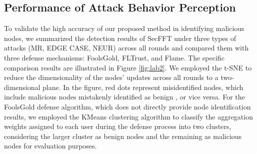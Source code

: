 \documentclass[lettersize,journal]{IEEEtran}
\begin{document}
\subsection{Performance of Attack Behavior Perception}
To validate the high accuracy of our proposed method in identifying malicious nodes, we summarized the detection results of SecFFT under three types of attacks (MR, EDGE CASE, NEUR) across all rounds and compared them with three defense mechanisms: FoolsGold, FLTrust, and Flame. The specific comparison results are illustrated in Figure \ref{fig:lab2}. We employed the t-SNE to reduce the dimensionality of the nodes' updates across all rounds to a two-dimensional plane. In the figure, red dots represent misidentified nodes, which include malicious nodes mistakenly identified as benign , or vice versa. For the FoolsGold defense algorithm, which does not directly provide node identification results, we employed the KMeans clustering algorithm to classify the aggregation weights assigned to each user during the defense process into two clusters, considering the larger cluster as benign nodes and the remaining as malicious nodes for evaluation purposes.
\end{document}
